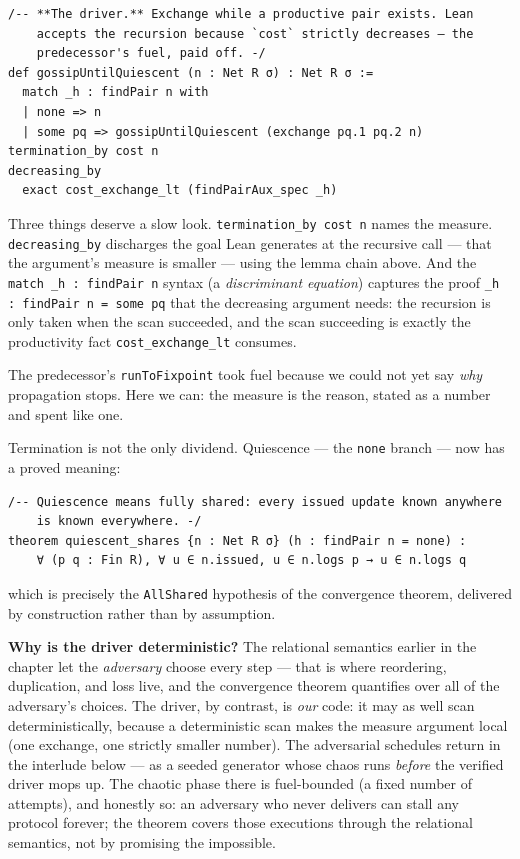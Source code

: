 \documentclass[12pt, a4paper, openright]{book}
\theoremstyle{thmstyle}
\theoremstyle{defstyle}
\newcommand{\lc}[1]{\texttt{#1}}
\newenvironment{notebox}{%
  \begin{tcolorbox}[notebox]%
}{\end{tcolorbox}}
\begin{document}
\begin{verbatim}
/-- **The driver.** Exchange while a productive pair exists. Lean
    accepts the recursion because `cost` strictly decreases — the
    predecessor's fuel, paid off. -/
def gossipUntilQuiescent (n : Net R σ) : Net R σ :=
  match _h : findPair n with
  | none => n
  | some pq => gossipUntilQuiescent (exchange pq.1 pq.2 n)
termination_by cost n
decreasing_by
  exact cost_exchange_lt (findPairAux_spec _h)
\end{verbatim}

Three things deserve a slow look. \lc{termination_by cost n} names the
measure. \lc{decreasing_by} discharges the goal Lean generates at the
recursive call --- that the argument's measure is smaller --- using the
lemma chain above. And the \lc{match _h : findPair n} syntax (a
\emph{discriminant equation}) captures the proof
\lc{_h : findPair n = some pq} that the decreasing argument needs: the
recursion is only taken when the scan succeeded, and the scan succeeding
is exactly the productivity fact \lc{cost_exchange_lt} consumes.

The predecessor's \lc{runToFixpoint} took fuel because we could not yet
say \emph{why} propagation stops. Here we can: the measure is the reason,
stated as a number and spent like one.

Termination is not the only dividend. Quiescence --- the \lc{none} branch
--- now has a proved meaning:

\begin{verbatim}
/-- Quiescence means fully shared: every issued update known anywhere
    is known everywhere. -/
theorem quiescent_shares {n : Net R σ} (h : findPair n = none) :
    ∀ (p q : Fin R), ∀ u ∈ n.issued, u ∈ n.logs p → u ∈ n.logs q
\end{verbatim}

which is precisely the \lc{AllShared} hypothesis of the convergence
theorem, delivered by construction rather than by assumption.

\begin{notebox}
  \textbf{Why is the driver deterministic?} The relational semantics
  earlier in the chapter let the \emph{adversary} choose every step ---
  that is where reordering, duplication, and loss live, and the
  convergence theorem quantifies over all of the adversary's choices.
  The driver, by contrast, is \emph{our} code: it may as well scan
  deterministically, because a deterministic scan makes the measure
  argument local (one exchange, one strictly smaller number). The
  adversarial schedules return in the interlude below --- as a seeded
  generator whose chaos runs \emph{before} the verified driver mops up.
  The chaotic phase there is fuel-bounded (a fixed number of attempts),
  and honestly so: an adversary who never delivers can stall any
  protocol forever; the theorem covers those executions through the
  relational semantics, not by promising the impossible.
\end{notebox}
\end{document}
